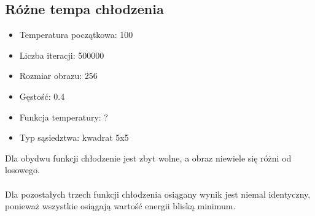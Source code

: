 \subsection{Różne tempa chłodzenia}
\begin{itemize}
    \item Temperatura początkowa: 100
    \item Liczba iteracji: 500000
    \item Rozmiar obrazu: 256
    \item Gęstość: 0.4
    \item Funkcja temperatury: ?
    \item Typ sąsiedztwa: kwadrat 5x5 
\end{itemize}
Dla obydwu funkcji chłodzenie jest zbyt wolne, a obraz niewiele się różni od losowego.\\
\\
Dla pozostałych trzech funkcji chłodzenia osiągany wynik jest niemal identyczny, ponieważ wszystkie osiągają wartość energii bliską minimum. 